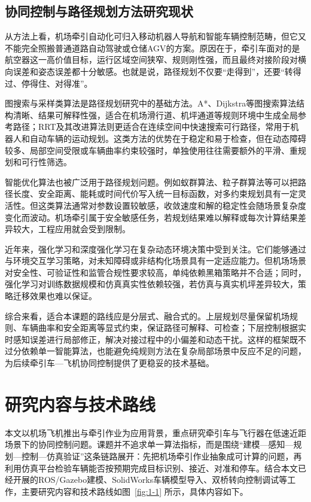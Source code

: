\subsection{协同控制与路径规划方法研究现状}

从方法上看，机场牵引自动化可归入移动机器人导航和智能车辆控制范畴，但它又不能完全照搬普通道路自动驾驶或仓储AGV的方案\cite{ref17,ref18,ref19,ref20,ref28}。原因在于，牵引车面对的是航空器这一高价值目标，运行区域空间狭窄、规则刚性强，而且最终对接阶段对横向误差和姿态误差都十分敏感。也就是说，路径规划不仅要``走得到''，还要``转得过、停得住、对得准''。

图搜索与采样类算法是路径规划研究中的基础方法。A*、Dijkstra等图搜索算法结构清晰、结果可解释性强，适合在机场滑行道、机坪通道等规则环境中生成全局参考路径\cite{ref22,ref23}；RRT及其改进算法则更适合在连续空间中快速搜索可行路径，常用于机器人和自动车辆的运动规划\cite{ref20,ref21,ref24}。这类方法的优势在于稳定和易于检查，但在动态障碍较多、局部空间受限或车辆曲率约束较强时，单独使用往往需要额外的平滑、重规划和可行性筛选。

智能优化算法也被广泛用于路径规划问题。例如蚁群算法、粒子群算法等可以把路径长度、安全距离、能耗或时间代价写入统一目标函数，对多约束规划具有一定灵活性。但这类算法通常对参数设置较敏感，收敛速度和解的稳定性会随场景复杂度变化而波动。机场牵引属于安全敏感任务，若规划结果难以解释或每次计算结果差异较大，工程应用就会受到限制。

近年来，强化学习和深度强化学习在复杂动态环境决策中受到关注。它们能够通过与环境交互学习策略，对未知障碍或非结构化场景具有一定适应能力。但机场场景对安全性、可验证性和监管合规性要求较高，单纯依赖黑箱策略并不合适；同时，强化学习对训练数据规模和仿真真实性依赖较强，若仿真与真实机坪差异较大，策略迁移效果也难以保证。

综合来看，适合本课题的路线应是分层式、融合式的。上层规划尽量保留机场规则、车辆曲率和安全距离等显式约束，保证路径可解释、可检查；下层控制根据实时感知误差进行局部修正，解决对接过程中的小偏差和动态干扰。这样的框架既不过分依赖单一智能算法，也能避免纯规则方法在复杂局部场景中反应不足的问题，为后续牵引车---飞机协同控制提供了更稳妥的技术基础\cite{ref25,ref28}。

\section{研究内容与技术路线}

本文以机场飞机推出与牵引作业为应用背景，重点研究牵引车与飞行器在低速近距场景下的协同控制问题。课题并不追求单一算法指标，而是围绕``建模---感知---规划---控制---仿真验证''这条链路展开：先把机场牵引作业抽象成可计算的问题，再利用仿真平台检验车辆能否按预期完成目标识别、接近、对准和停车。结合本文已经开展的ROS/Gazebo建模、SolidWorks车辆模型导入、双桥转向控制调试等工作，主要研究内容和技术路线如图~\ref{fig:1-1} 所示，具体内容如下。

